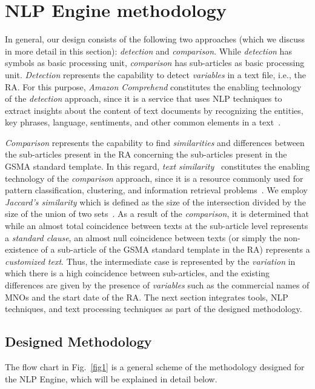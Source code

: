 \section{NLP Engine methodology}\label{sec:methodology}
In general, our design consists of the following two approaches (which we discuss in more detail in this section): \textit{detection} and \textit{comparison}. While \textit{detection} has symbols as basic processing unit, \textit{comparison} has sub-articles as basic processing unit. \textit{Detection} represents the capability to detect \textit{variables} in a text file, i.e., the RA. For this purpose, \textit{Amazon Comprehend} constitutes the enabling technology of the \textit{detection} approach, since it is a service that uses NLP techniques to extract insights about the content of text documents by recognizing  the  entities,  key  phrases,  language,  sentiments,  and  other  common  elements  in  a  text~\cite{AWS2021}.

\textit{Comparison} represents the capability to find \textit{similarities} and differences between the sub-articles present in the RA concerning the sub-articles present in the GSMA standard template. In this regard, \textit{text similarity}~\cite{Deza2009} constitutes the enabling technology of the \textit{comparison} approach, since it is a resource commonly used for pattern classification, clustering, and information retrieval problems~\cite{7429408}. We employ \textit{Jaccard's similarity} which is defined as the size of the intersection divided by the size of the union of two sets~\cite{Gupta2018}. As a result of the \textit{comparison}, it is determined that while an almost total coincidence between texts at the sub-article level represents a \textit{standard clause}, an almost null coincidence between texts (or simply the non-existence of a sub-article of the GSMA standard template in the RA) represents a \textit{customized text}. Thus, the intermediate case is represented by the \textit{variation} in which there is a high coincidence between sub-articles, and the existing differences are given by the presence of \textit{variables} such as the commercial names of MNOs and the start date of the RA. The next section integrates tools, NLP techniques, and text processing techniques as part of the designed methodology.

\subsection{Designed Methodology}
The flow chart in Fig.~\ref{fig1} is a general scheme of the methodology designed for the NLP Engine, which will be explained in detail below.


